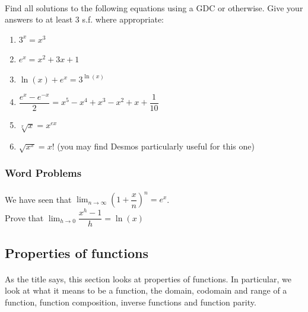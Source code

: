 \documentclass[12pt, a4paper, titlepage, twoside]{article}
\begin{document}
	\paragraph{}
	 Find all solutions to the following equations using a GDC or otherwise.
	Give your answers to at least 3 s.f. where appropriate:
	
	\begin{multicols}{2}
		\begin{enumerate}[label=\textbf{(\alph*)}]
			\item $3^x = x^3$ 
			\item $e^x = x^2 + 3x + 1$
			\item $\ln(x) + e^x = 3^{\ln(x)}$
			\item $\dfrac{e^x - e^{-x}}{2} = x^5-x^4+x^3-x^2+x+\dfrac{1}{10}$
			\item $\sqrt[x]{x} = x^{ex}$
			\item $\sqrt{x^x} = x!$ (you may find Desmos particularly useful for this one)
		\end{enumerate}
	\end{multicols}
	
	\hfill
	
	\subsubsection*{Word Problems}
	
	\paragraph{}
	 We have seen that $\displaystyle \lim_{n \to \infty} \left(1+\dfrac{x}{n}\right)^n = e^x$.\\
	Prove that $\displaystyle \lim_{h \to 0} \dfrac{x^h - 1}{h} = \ln(x)$
	
	\hfill
	
	\subsection{Properties of functions}
	
	\paragraph{}
	As the title says, this section looks at properties of functions. In particular, we look at what it means to be a function, the domain, codomain
	and range of a function, function composition, inverse functions and function parity.
	
\end{document}
